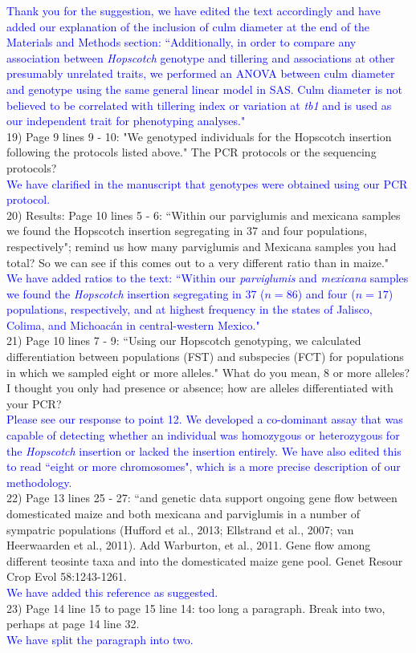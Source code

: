 \documentclass[11pt]{article}
\newcommand{\res}[1]{\noindent \textcolor{blue}{{#1}} \\}
\begin{document}
\res{Thank you for the suggestion, we have edited the text accordingly and have added our explanation of the inclusion of culm diameter at the end of the Materials and Methods section: ``Additionally, in order to compare any association between \emph{Hopscotch} genotype and tillering and associations at other presumably unrelated traits, we performed an ANOVA between culm diameter and genotype using the same general linear model in SAS. Culm diameter is not believed to be correlated with tillering index or variation at \emph{tb1} and is used as our independent trait for phenotyping analyses."}

19) Page 9 lines 9 - 10: "We genotyped individuals for the Hopscotch insertion following the protocols listed above." The PCR protocols or the sequencing protocols?\\ 

\res{We have clarified in the manuscript that genotypes were obtained using our PCR protocol.}

20) Results:
Page 10 lines 5 - 6: ``Within our parviglumis and mexicana samples we found the Hopscotch insertion segregating in 37 and four populations, respectively"; remind us how many parviglumis and Mexicana samples you had total? So we can see if this comes out to a very different ratio than in maize."\\ 

\res{We have added ratios to the text: ``Within our \emph{parviglumis} and \emph{mexicana} samples we found the \emph{Hopscotch} insertion segregating in 37 ($n=86$) and four ($n=17$) populations, respectively, and at highest frequency in the states of Jalisco, Colima, and Michoac\'{a}n in central-western Mexico."}

21) Page 10 lines 7 - 9: ``Using our Hopscotch genotyping, we calculated diﬀerentiation between populations (FST) and subspecies (FCT) for populations in which we sampled eight or more alleles." What do you mean, 8 or more alleles? I thought you only had presence or absence; how are alleles differentiated with your PCR?\\ 

\res{Please see our response to point 12.  We developed a co-dominant assay that was capable of detecting whether an individual was homozygous or heterozygous for the \emph{Hopscotch} insertion or lacked the insertion entirely.  We have also edited this to read ``eight or more chromosomes", which is a more precise description of our methodology.}

22) Page 13 lines 25 - 27: ``and genetic data support ongoing gene flow between domesticated maize and both mexicana and parviglumis in a number of sympatric populations (Hufford et al., 2013; Ellstrand et al., 2007; van Heerwaarden et al., 2011). Add Warburton, et al., 2011.  Gene flow among different teosinte taxa and into the domesticated maize gene pool.  Genet Resour Crop Evol 58:1243-1261.\\ 

\res{We have added this reference as suggested.}

23) Page 14 line 15 to page 15 line 14: too long a paragraph. Break into two, perhaps at page 14 line 32.\\ 

\res{We have split the paragraph into two.}


\end{document}

